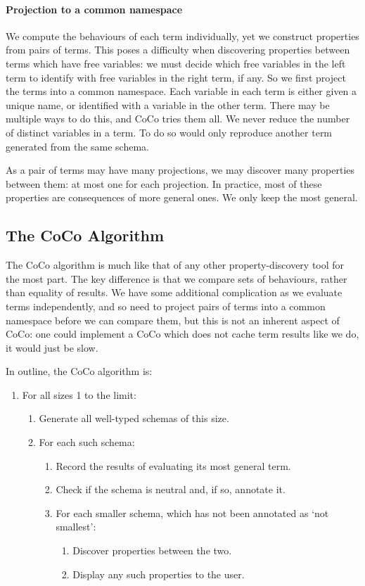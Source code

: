 \paragraph{Projection to a common namespace}
We compute the behaviours of each term individually, yet we construct
properties from pairs of terms.  This poses a difficulty when
discovering properties between terms which have free variables: we
must decide which free variables in the left term to identify with
free variables in the right term, if any.  So we first project the
terms into a common namespace.  Each variable in each term is either
given a unique name, or identified with a variable in the other term.
There may be multiple ways to do this, and CoCo tries them all.  We
never reduce the number of distinct variables in a term.  To do so
would only reproduce another term generated from the same schema.

As a pair of terms may have many projections, we may discover many
properties between them: at most one for each projection.  In
practice, most of these properties are consequences of more general
ones.  We only keep the most general.

\subsection{The CoCo Algorithm}
\label{sec:coco-hiw-algo}

The CoCo algorithm is much like that of any other property-discovery
tool for the most part.  The key difference is that we compare sets of
behaviours, rather than equality of results.  We have some additional
complication as we evaluate terms independently, and so need to
project pairs of terms into a common namespace before we can compare
them, but this is not an inherent aspect of CoCo: one could implement
a CoCo which does not cache term results like we do, it would just be
slow.

In outline, the CoCo algorithm is:

\begin{enumerate}
\item For all sizes 1 to the limit:
  \begin{enumerate}
  \item Generate all well-typed schemas of this size.
  \item For each such schema:
    \begin{enumerate}
    \item Record the results of evaluating its most general term.
    \item Check if the schema is neutral and, if so, annotate it.
    \item For each smaller schema, which has not been annotated as
      `not smallest':
      \begin{enumerate}
      \item Discover properties between the two.
      \item Display any such properties to the user.
      \end{enumerate}
    \end{enumerate}
  \end{enumerate}
\end{enumerate}

